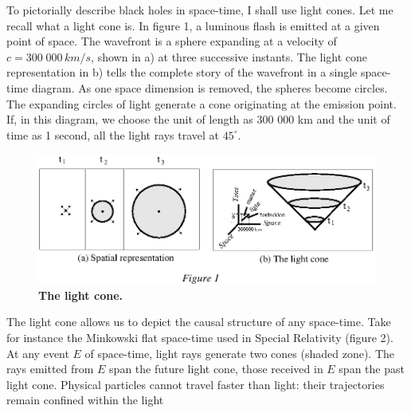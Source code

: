 \documentclass[12pt]{article}
\begin{document}
To pictorially describe black holes in space-time, I shall use light cones.
Let me recall what a light cone is.
In figure 1, a luminous flash is emitted at a given point of
space. The wavefront is a sphere expanding at a velocity of 
$c = 300\;000 \, km/s$,
shown in a) at three successive instants. The light cone
representation in b) tells the complete story of the wavefront in a single
space-time diagram. As one space dimension is removed, the spheres become
circles. The expanding circles of light generate a cone originating at the
emission point. If, in this diagram, we choose the unit of length as 300 000 km
and the unit of time as 1 second, all the light rays
travel at $45^{\circ}$.

\begin{figure}[htb]
  \begin{center}
    \leavevmode
    \includegraphics{lightcone.ps}
    \caption{\textbf{The light cone.}}
  \end{center}
\end{figure}
The light cone allows us to depict the causal structure of any space-time. Take
for instance the Minkowski flat space-time used in Special
Relativity (figure 2). At any event $E$ of space-time, light rays generate two
cones (shaded zone). The rays emitted from $E$ span the future light cone, those
received in $E$ span the past light cone.  Physical particles cannot travel
faster than light: their trajectories remain confined within the light
\end{document}
